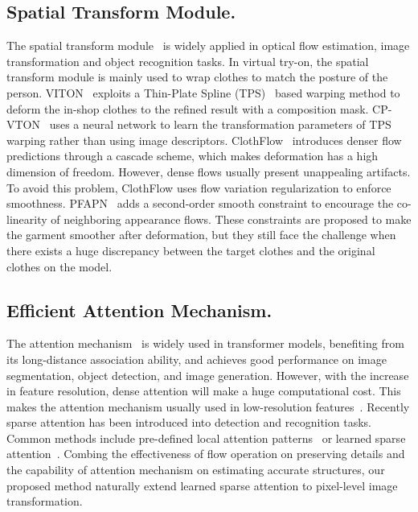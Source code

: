 \documentclass[runningheads]{llncs}
\begin{document}
\subsection{Spatial Transform Module.}
The spatial transform module~\cite{jaderberg2015spatial,zhou2016view,ren2020deep,sun2018pwc,yu2020motion} is widely applied in optical flow estimation, image transformation and object recognition tasks. In virtual try-on, the spatial transform module is mainly used to wrap clothes to match the posture of the person. VITON~\cite{han2018viton} exploits a Thin-Plate Spline (TPS)~\cite{duchon1977splines} based warping method to deform the in-shop clothes to the refined result with a composition mask. CP-VTON~\cite{CPVTON} uses a neural network to learn the transformation parameters of TPS warping rather than using image descriptors. ClothFlow~\cite{han2019clothflow} introduces denser flow predictions through a cascade scheme, which makes deformation has a high dimension of freedom. 
However, dense flows usually present unappealing artifacts. To avoid this problem, ClothFlow uses flow variation regularization to enforce smoothness. PFAPN~\cite{ge2021parser} adds a second-order smooth constraint to encourage the co-linearity of neighboring appearance flows. These constraints are proposed to make the garment smoother after deformation, but they still face the challenge when there exists a huge discrepancy between the target clothes and the original clothes on the model.


\subsection{Efficient Attention Mechanism.} The attention mechanism~\cite{vaswani2017attention} is widely used in transformer models, benefiting from its long-distance association ability, and achieves good performance on image segmentation, object detection, and image generation. However, with the increase in feature resolution, dense attention will make a huge computational cost. This makes the attention mechanism usually used in low-resolution features~\cite{ren2021combining}. Recently sparse attention has been introduced into detection and recognition tasks. Common methods include pre-defined local attention patterns~\cite{liu2018generating,liu2021swin,qiu2019blockwise} or learned sparse attention~\cite{zhu2020deformable,wang2020linformer,kitaev2020reformer,tay2020sparse}. Combing the effectiveness of flow operation on preserving details and the capability of attention mechanism on estimating accurate structures, our proposed method naturally extend learned sparse attention to pixel-level image transformation.
\end{document}
